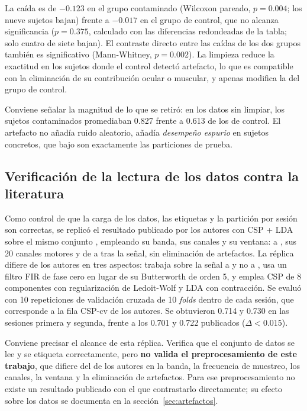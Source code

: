 La caída es de $-0.123$ en el grupo contaminado (Wilcoxon pareado, $p = 0.004$;
los nueve sujetos bajan) frente a $-0.017$ en el grupo de control, que no alcanza
significancia ($p = 0.375$, calculado con las diferencias redondeadas de la tabla; solo cuatro
de siete bajan). El contraste directo entre las caídas de los dos grupos también es
significativo (Mann-Whitney, $p = 0.002$). La limpieza reduce la exactitud en los sujetos
donde el control detectó artefacto, lo que es compatible con la eliminación de su
contribución ocular o muscular, y apenas modifica la del grupo de control.

Conviene señalar la magnitud de lo que se retiró: en los datos sin limpiar, los
sujetos contaminados promediaban 0.827 frente a 0.613 de los de control. El
artefacto no añadía ruido aleatorio, añadía \emph{desempeño espurio} en sujetos
concretos, que bajo \loso{} son exactamente las particiones de prueba.

\subsection{Verificación de la lectura de los datos contra la literatura}
\label{sec:replica}

Como control de que la carga de los datos, las etiquetas y la partición por sesión son
correctas, se replicó el resultado publicado por los autores con CSP + LDA sobre el mismo
conjunto \cite{lee2019}, empleando su banda, sus canales y su ventana:  a ,
sus 20 canales motores y de  a  tras la señal, sin eliminación de
artefactos. La réplica difiere de los autores en tres aspectos: trabaja sobre la señal a
 y no a , usa un filtro FIR de fase cero en lugar de su Butterworth de
orden 5, y emplea CSP de 8 componentes con regularización de Ledoit-Wolf y LDA con
contracción. Se evaluó con 10 repeticiones de validación cruzada de 10 \textit{folds} dentro de
cada sesión, que corresponde a la fila CSP-cv de los autores. Se
obtuvieron 0.714 y 0.730 en las sesiones primera y segunda, frente a los 0.701 y 0.722
publicados ($\Delta < 0.015$).

Conviene precisar el alcance de esta réplica. Verifica que el conjunto de datos se lee y se
etiqueta correctamente, pero \textbf{no valida el preprocesamiento de este trabajo}, que
difiere del de los autores en la banda, la frecuencia de muestreo, los canales, la ventana y
la eliminación de artefactos. Para ese preprocesamiento no existe un resultado publicado con
el que contrastarlo directamente; su efecto sobre los datos se documenta en la
sección~\ref{sec:artefactos}.

